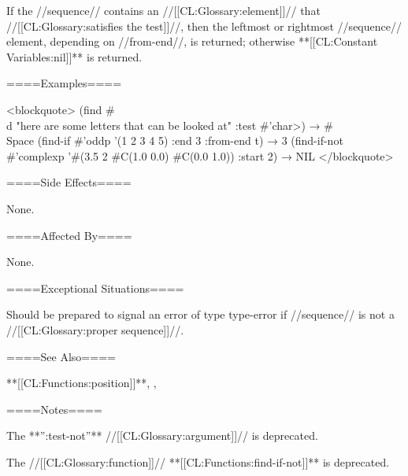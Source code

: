 If the //sequence// contains an //[[CL:Glossary:element]]// that //[[CL:Glossary:satisfies the test]]//, then the leftmost or rightmost //sequence// element, depending on //from-end//, is returned; otherwise **[[CL:Constant Variables:nil]]** is returned.

====Examples====

<blockquote> (find #\\d "here are some letters that can be looked at" :test #'char>) → #\\Space (find-if #'oddp '(1 2 3 4 5) :end 3 :from-end t) → 3 (find-if-not #'complexp '#(3.5 2 #C(1.0 0.0) #C(0.0 1.0)) :start 2) → NIL </blockquote>

====Side Effects====

None.

====Affected By====

None.

====Exceptional Situations====

Should be prepared to signal an error of type type-error if //sequence// is not a //[[CL:Glossary:proper sequence]]//.

====See Also====

**[[CL:Functions:position]]**, {\secref\TestFunctionRules},

{\secref\TraversalRules}

====Notes====

The **'':test-not''** //[[CL:Glossary:argument]]// is deprecated.

The //[[CL:Glossary:function]]// **[[CL:Functions:find-if-not]]** is deprecated.

    

